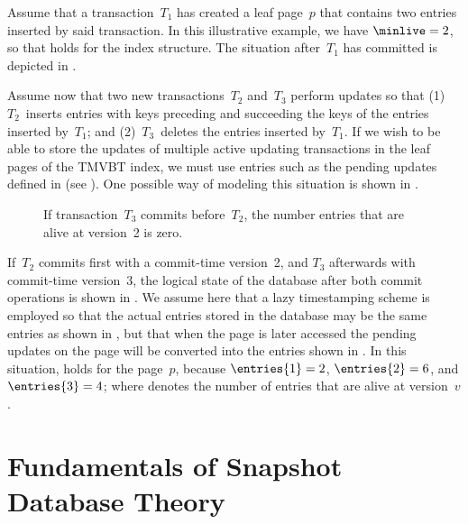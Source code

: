 Assume that a transaction~$T_1$ has created a leaf page~$p$ that contains two
entries inserted by said transaction.
In this illustrative example, we have $\minlive = 2$, so that
 holds for the index structure. 
The situation after~$T_1$ has committed is depicted in
.

Assume now that two new transactions~$T_2$ and~$T_3$ perform updates so that
(1)~$T_2$~inserts entries with keys preceding and succeeding the keys of the
entries inserted by~$T_1$; and 
(2)~$T_3$~deletes the entries inserted by~$T_1$.
If we wish to be able to store the updates of multiple active updating
transactions in the leaf pages of the TMVBT index, we must use entries such as
the pending updates defined in  (see
). 
One possible way of modeling this situation is shown in
.

\begin{figure}[!htb]
\begin{center}

%
{If transaction~$T_3$ commits before~$T_2$, the number entries that are alive
at version~\num{2} is zero.}
\label{fig:tmvbt:multi-update}
\end{center}
\end{figure}

If~$T_2$ commits first with a commit-time version~\num{2}, and $T_3$
afterwards with commit-time version~\num{3}, the logical state of the database
after both commit operations is shown in
. 
We assume here that a lazy timestamping scheme is employed so that the
actual entries stored in the database may be the same entries as shown in
, but that when the page is
later accessed the pending updates on the page will be converted into the
entries shown in .
In this situation,  holds for the page~$p$,
because $\entries{1} = 2$, $\entries{2} = 6$, and $\entries{3} = 4$; where
 denotes the number of entries that are alive at version~$v$.


\section{Fundamentals of Snapshot Database Theory}
\label{sec:mv-data:snapshot}


